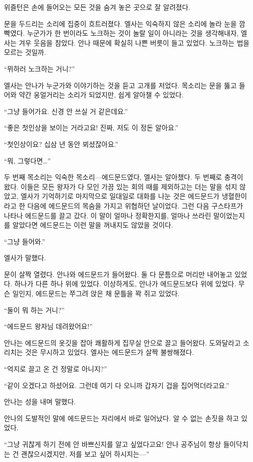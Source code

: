 위즐턴은 손에 들어오는 모든 것을 숨겨 놓은 곳으로 잘 알려졌다.

문을 두드리는 소리에 집중이 흐트러졌다. 엘사는 익숙하지 않은 소리에 놀라 눈을 깜빡였다. 누군가가 한 번이라도 노크하는 것이 놀랄 일이 아니라는 것을 생각해내자, 엘사는 겨우 웃음을 참았다. 안나 때문에 확실히 나쁜 버릇이 들고 있었다. 노크하는 법을 모르는 것일까.

``뮈하러 노크하는 거니?''

엘사는 안나가 누군가와 이야기하는 것을 듣고 고개를 저었다. 목소리는 문을 뚫고 들어와 약간 웅얼거리는 소리가 되었지만, 쉽게 알아챌 수 있었다.

``그냥 들어가요. 신경 안 쓰실 거 같은데요.''

``좋은 첫인상을 보이는 거라고요! 진짜, 저도 이 정돈 알아요.''

``첫인상이요? 십삼 년 동안 뵈셨잖아요.''

``뭐, 그렇다면\ldots''

두 번째 목소리는 익숙한 목소리—에드문드였다, 엘사는 알아챘다. 두 번째로 충격이 왔다. 이들은 모든 왕자가 다 모인 가끔 있는 회의 때를 제외하고는 더는 말을 섞지 않았고, 엘사가 기억하기로 마지막으로 일대일로 대화를 나눈 것은 에드문드가 냉혈한이라고 한 다음에 에드문드의 목숨을 가지고 위협하던 날이었다. 그런 다음 구스타프가 나타나 에드문드를 끌고 갔다. 이 말이 얼마나 정확한지를, 얼마나 쓰라린 말이었는지를 알았다면 에드문드는 이런 말을 꺼내지도 않았을 것이다.

``그냥 들어와.''

엘사가 말했다.

문이 살짝 열렸다. 안나와 에드문드가 들어왔다. 둘 다 문틈으로 머리만 내어놓고 있었다. 하나가 다른 하나 위에 있었다. 이상하게도, 안나가 에드문드보다 위에 있었다. 무슨 일인지, 에드문드는 쭈그려 앉은 채 문틀을 꽉 쥐고 있었다.

``둘이 뭐 하는 거니?''

``에드문드 왕자님 데려왔어요!''

안나는 에드문드의 옷깃을 잡아 쾌활하게 집무실 안으로 끌고 들어왔다. 도와달라고 소리치는 것은 무시하고 있었다. 엘사는 에드문드가 살짝 불쌍해졌다.

``억지로 끌고 온 건 정말로 아니지?''

``같이 오겠다고 하셨어요. 그런데 여기 다 오니까 갑자기 겁을 집어먹더라고요.''

안나는 성을 내며 말했다.

안나의 도발적인 말에 에드문드는 자리에서 바로 일어났다. 알 수 없는 손짓을 하고 있었다.

``그냥 귀찮게 하기 전에 안 바쁘신지를 알고 싶었다고요! 안나 공주님이 항상 들이닥치는 건 괜찮으시겠지만, 저를 보고 싶어 하시지는—''

